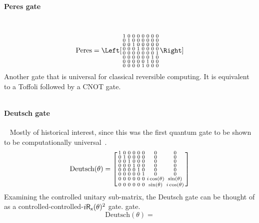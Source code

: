 \paragraph{Peres gate}~\cite{Peres1985a}
\[
\text{Peres} = 
\Left[ \begin{smallmatrix}
                1& 0& 0& 0& 0& 0& 0& 0 \\
                0& 1& 0& 0& 0& 0& 0& 0 \\
                0& 0& 1& 0& 0& 0& 0& 0 \\
                0& 0& 0& 1& 0& 0& 0& 0 \\
                0& 0& 0& 0& 0& 0& 0& 1 \\
                0& 0& 0& 0& 0& 0& 1& 0 \\
                0& 0& 0& 0& 0& 1& 0& 0 \\
                0& 0& 0& 0& 1& 0& 0& 0 
\end{smallmatrix} \Right]
\]
Another gate that is universal for classical reversible computing. It is equivalent to a Toffoli followed by a CNOT gate.

$$

$$




\paragraph{Deutsch gate}~\cite{Deutsch1989a, Barenco1995a, Shi2018a}
 Mostly of historical interest, since this was the first quantum gate to be shown to be computationally universal~\cite{Deutsch1989a}. 
\[
\text{Deutsch}(\theta) =
\begin{bsmallmatrix}
                1& 0& 0& 0& 0& 0& 0& 0 \\
                0& 1& 0& 0& 0& 0& 0& 0 \\
                0& 0& 1& 0& 0& 0& 0& 0 \\
                0& 0& 0& 1& 0& 0& 0& 0 \\
                0& 0& 0& 0& 1& 0& 0& 0 \\
                0& 0& 0& 0& 0& 1& 0& 0 \\
                0& 0& 0& 0& 0& 0& i \cos(\theta) & \sin(\theta) \\
                0& 0& 0& 0& 0& 0& \sin(\theta)& i \cos(\theta)
\end{bsmallmatrix}
\]
Examining the controlled unitary sub-matrix, the Deutsch gate can be thought of as a controlled-controlled-$i\Gate{R_x}(\theta)^2$ gate. gate.
$$
\text{Deutsch}(\theta) = 

$$

